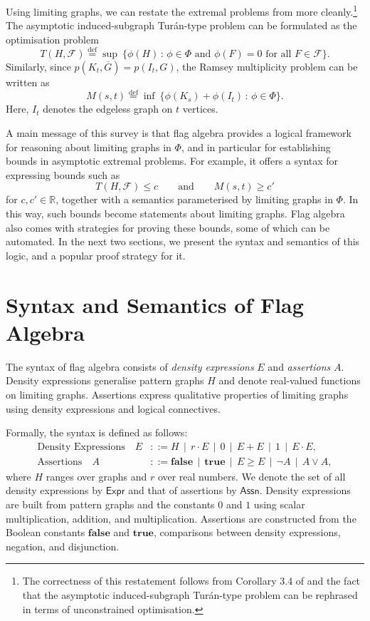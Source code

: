\documentclass{article}
\newcommand*{\defeq}{\stackrel{\mathrm{def}}{=}}
\newcommand*{\lfalse}{\mathbf{false}}
\newcommand*{\ltrue}{\mathbf{true}}
\newcommand*{\Expr}{\mathsf{Expr}}
\newcommand*{\Assn}{\mathsf{Assn}}
\begin{document}
Using limiting graphs, we can restate the extremal problems from  more cleanly.\footnote{The correctness of this restatement follows from Corollary 3.4 of \cite{Razborov2007} and the fact that the asymptotic induced-subgraph Tur\'an-type problem can be rephrased in terms of unconstrained optimisation.} The
asymptotic induced-subgraph Tur\'an-type problem can be formulated as the optimisation problem
\[
T(H, \mathcal{F}) \defeq \sup\ \{ \phi(H) \,:\, \phi \in \Phi \text{ and } \phi(F) = 0 \text{ for all } F \in \mathcal{F} \}.
\]
Similarly, since $p(K_t,\overline{G}) = p(I_t,G)$, the Ramsey multiplicity problem can be written as
\[
M(s,t) \defeq
\inf\ \{ \phi(K_s) + \phi(I_t) \,:\, \phi \in \Phi \}.
\]
Here, $I_t$ denotes the edgeless graph on $t$ vertices.

A main message of this survey is that flag algebra provides a logical framework for reasoning about limiting graphs in $\Phi$, and in particular for establishing bounds in asymptotic extremal problems. For example, it offers a syntax for expressing bounds such as
\[
T(H, \mathcal{F}) \leq c
\qquad\text{and}\qquad
M(s,t) \geq c'
\]
for $c,c' \in \mathbb{R}$, together with a semantics parameterised by limiting graphs in $\Phi$. In this way, such bounds become statements about limiting graphs. Flag algebra also comes with strategies for proving these bounds, some of which can be automated. In the next two sections, we present the syntax and semantics of this logic, and a popular proof strategy for it.

\section{Syntax and Semantics of Flag Algebra}
\label{sec:syntax-semantics}

The syntax of flag algebra consists of \emph{density expressions} $E$ and \emph{assertions} $A$.
Density expressions generalise pattern graphs $H$ and denote real-valued functions on limiting graphs.
Assertions express qualitative properties of limiting graphs using density expressions and logical connectives.

Formally, the syntax is defined as follows:
\begin{align*}
\text{Density Expressions}\quad E & ::= H \,\mid\, r \cdot E \,\mid\, 0 \,\mid\, E + E \,\mid\, 1 \,\mid\, E \cdot E,
\\
\text{Assertions}\quad A & ::= \lfalse \,\mid\, \ltrue \,\mid\, E \geq E \,\mid\, \neg A \,\mid\, A \lor A,
\end{align*}
where $H$ ranges over graphs and $r$ over real numbers. We denote the set of all density expressions by $\Expr$ and that of assertions by $\Assn$.
Density expressions are built from pattern graphs and the constants $0$ and $1$ using scalar multiplication, addition, and multiplication.
Assertions are constructed from the Boolean constants $\lfalse$ and $\ltrue$, comparisons between density expressions, negation, and disjunction.
\end{document}
